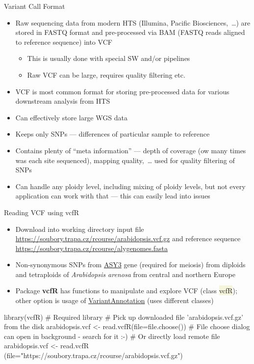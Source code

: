 \documentclass[compress, xelatex, 11pt, xcolor=svgnames, aspectratio=169, url={hyphens, lowtilde}]{beamer}
\renewcommand{\texttt}[1]{\colorbox{Beige}{{\ttfamily #1}}}
\begin{document}
\begin{frame}{Variant Call Format}
	\begin{itemize}
		\item Raw sequencing data from modern HTS (Illumina, Pacific Biosciences,~\ldots) are stored in FASTQ format and pre-processed via BAM (FASTQ reads aligned to reference sequence) into VCF
		\begin{itemize}
			\item This is usually done with special SW and/or pipelines
			\item Raw VCF can be large, requires quality filtering etc.
		\end{itemize}
		\item VCF is most common format for storing pre-processed data for various downstream analysis from HTS
		\item Can effectively store large WGS data
		\item Keeps only SNPs --- differences of particular sample to reference
		\item Contains plenty of \enquote{meta information} --- depth of coverage (ow many times was each site sequenced), mapping quality,~\ldots{ }used for quality filtering of SNPs
		\item Can handle any ploidy level, including mixing of ploidy levels, but not every application can work with that --- this can easily lead into issues
	\end{itemize}
\end{frame}

\begin{frame}[fragile]{Reading VCF using vcfR}
	\begin{itemize}
		\item Download into working directory input file \url{https://soubory.trapa.cz/rcourse/arabidopsis.vcf.gz} and reference sequence \url{https://soubory.trapa.cz/rcourse/alygenomes.fasta}
		\item Non-synonymous SNPs from \href{https://www.arabidopsis.org/servlets/TairObject?type=locus&name=At2g46980}{ASY3} gene (required for meiosis) from diploids and tetraploids of \textit{Arabidopsis arenosa} from central and northern Europe
		\item Package \textbf{vcfR} has functions to manipulate and explore VCF (class \texttt{vcfR}); other option is usage of \href{https://bioconductor.org/packages/release/bioc/html/VariantAnnotation.html}{VariantAnnotation} (uses different classes)
	\end{itemize}
	\begin{spluscode}
    library(vcfR) # Required library
    # Pick up downloaded file 'arabidopsis.vcf.gz' from the disk
    arabidopsis.vcf <- read.vcfR(file=file.choose())
    # File choose dialog can open in background - search for it :-)
    # Or directly load remote file
    arabidopsis.vcf <- read.vcfR
      (file="https://soubory.trapa.cz/rcourse/arabidopsis.vcf.gz")
	\end{spluscode}
\end{frame}
\end{document}
